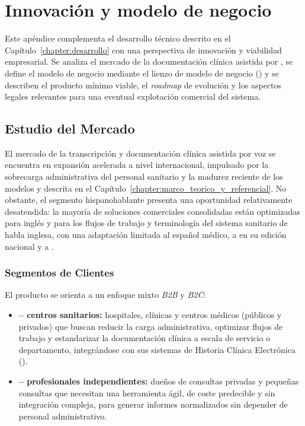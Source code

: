 \chapter{Innovación y modelo de negocio}\label{appendix:innovacion}

Este apéndice complementa el desarrollo técnico descrito en el Capítulo~\ref{chapter:desarrollo} con
una perspectiva de innovación y viabilidad empresarial. Se analiza el mercado de la documentación
clínica asistida por , se define el modelo de negocio mediante el lienzo de modelo de
negocio () y se describen el producto mínimo viable, el
\textit{roadmap} de evolución y los aspectos legales relevantes para una eventual explotación
comercial del sistema.

\section{Estudio del Mercado}\label{section:innovacion_mercado}

El mercado de la transcripción y documentación clínica asistida por voz se encuentra en expansión
acelerada a nivel internacional, impulsado por la sobrecarga administrativa del personal sanitario y
la madurez reciente de los modelos  y  descrita en el
Capítulo~\ref{chapter:marco_teorico_y_referencial}. No obstante, el segmento hispanohablante presenta
una oportunidad relativamente desatendida: la mayoría de soluciones comerciales consolidadas
están optimizadas para inglés y para los
flujos de trabajo y terminología del sistema sanitario de habla inglesa, con una adaptación limitada al
español médico, a  en su edición nacional y a .

\subsection{Segmentos de Clientes}\label{section:innovacion_segmentos}

El producto se orienta a un enfoque mixto \textit{B2B} y \textit{B2C}:

\begin{itemize}
    \item \textbf{ -- centros sanitarios:} hospitales, clínicas y centros médicos
    (públicos y privados) que buscan reducir la carga administrativa, optimizar flujos de trabajo y
    estandarizar la documentación clínica a escala de servicio o departamento, integrándose con sus
    sistemas de Historia Clínica Electrónica ().
    \item \textbf{ -- profesionales independientes:} dueños de consultas privadas
    y pequeñas consultas que necesitan una herramienta ágil, de coste predecible y sin integración
    compleja, para generar informes normalizados sin depender de personal administrativo.
\end{itemize}

